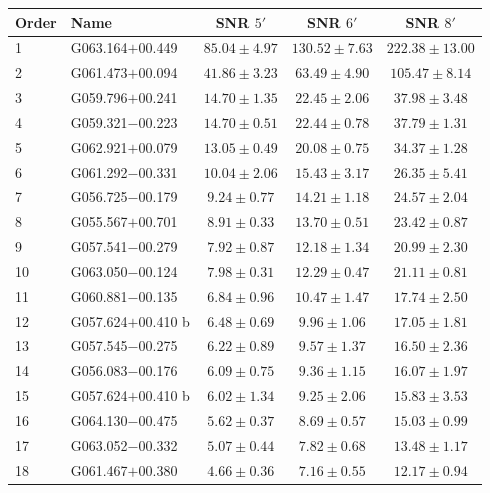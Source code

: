 \begin{table}[H]
    \centering
    \small
    \begin{tabular}{l l c c c}
        \toprule
        Order & Name & SNR $5'$ & SNR $6'$ & SNR $8'$ \\
        \midrule
        1 & G063.164$+$00.449 & $85.04 \pm 4.97$ & $130.52 \pm 7.63$ & $222.38 \pm 13.00$ \\
        2 & G061.473$+$00.094 & $41.86 \pm 3.23$ & $63.49 \pm 4.90$ & $105.47 \pm 8.14$ \\
        3 & G059.796$+$00.241 & $14.70 \pm 1.35$ & $22.45 \pm 2.06$ & $37.98 \pm 3.48$ \\
        4 & G059.321$-$00.223 & $14.70 \pm 0.51$ & $22.44 \pm 0.78$ & $37.79 \pm 1.31$ \\
        5 & G062.921$+$00.079 & $13.05 \pm 0.49$ & $20.08 \pm 0.75$ & $34.37 \pm 1.28$ \\
        6 & G061.292$-$00.331 & $10.04 \pm 2.06$ & $15.43 \pm 3.17$ & $26.35 \pm 5.41$ \\
        7 & G056.725$-$00.179 & $9.24 \pm 0.77$ & $14.21 \pm 1.18$ & $24.57 \pm 2.04$ \\
        8 & G055.567$+$00.701 & $8.91 \pm 0.33$ & $13.70 \pm 0.51$ & $23.42 \pm 0.87$ \\
        9 & G057.541$-$00.279 & $7.92 \pm 0.87$ & $12.18 \pm 1.34$ & $20.99 \pm 2.30$ \\
        10 & G063.050$-$00.124 & $7.98 \pm 0.31$ & $12.29 \pm 0.47$ & $21.11 \pm 0.81$ \\
        11 & G060.881$-$00.135 & $6.84 \pm 0.96$ & $10.47 \pm 1.47$ & $17.74 \pm 2.50$ \\
        12 & G057.624$+$00.410 b & $6.48 \pm 0.69$ & $9.96 \pm 1.06$ & $17.05 \pm 1.81$ \\
        13 & G057.545$-$00.275 & $6.22 \pm 0.89$ & $9.57 \pm 1.37$ & $16.50 \pm 2.36$ \\
        14 & G056.083$-$00.176 & $6.09 \pm 0.75$ & $9.36 \pm 1.15$ & $16.07 \pm 1.97$ \\
        15 & G057.624$+$00.410 b & $6.02 \pm 1.34$ & $9.25 \pm 2.06$ & $15.83 \pm 3.53$ \\
        16 & G064.130$-$00.475 & $5.62 \pm 0.37$ & $8.69 \pm 0.57$ & $15.03 \pm 0.99$ \\
        17 & G063.052$-$00.332 & $5.07 \pm 0.44$ & $7.82 \pm 0.68$ & $13.48 \pm 1.17$ \\
        18 & G061.467$+$00.380 & $4.66 \pm 0.36$ & $7.16 \pm 0.55$ & $12.17 \pm 0.94$ \\

\end{tabular}
\end{table}
